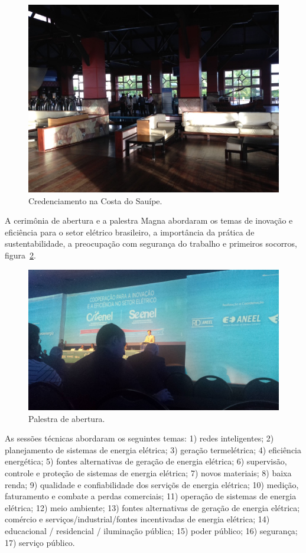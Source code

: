 \documentclass[12pt,a4paper]{article}
\begin{document}
\begin{figure}[h!]	
	\includegraphics[width=\columnwidth]{figs/entrada.JPG}
	\caption{Credenciamento na Costa do Sauípe.}
	\label{fig::entrada}
\end{figure}

A cerimônia de abertura e a palestra Magna abordaram os temas de inovação e
eficiência para o setor elétrico brasileiro, a importância da prática de
sustentabilidade, a preocupação com segurança do trabalho e primeiros socorros,
figura~\ref{fig::abertura}.

\begin{figure}[h!]	
	\includegraphics[width=\columnwidth]{figs/abertura.jpg}
	\caption{Palestra de abertura.}
	\label{fig::abertura}
\end{figure}

As sessões técnicas abordaram os seguintes temas: 1) redes inteligentes; 2)
planejamento de sistemas de energia elétrica; 3) geração termelétrica; 4)
eficiência energética; 5) fontes alternativas de geração de energia elétrica; 6)
supervisão, controle e proteção de sistemas de energia elétrica; 7) novos
materiais; 8) baixa renda; 9) qualidade e confiabilidade dos serviçõs de energia
elétrica; 10) medição, faturamento e combate a perdas comerciais; 11) operação
de sistemas de energia elétrica; 12) meio ambiente; 13) fontes alternativas de
geração de energia elétrica; comércio e serviços/industrial/fontes incentivadas
de energia elétrica; 14) educacional / residencial / iluminação pública; 15)
poder público; 16) segurança; 17) serviço público.
\end{document}
